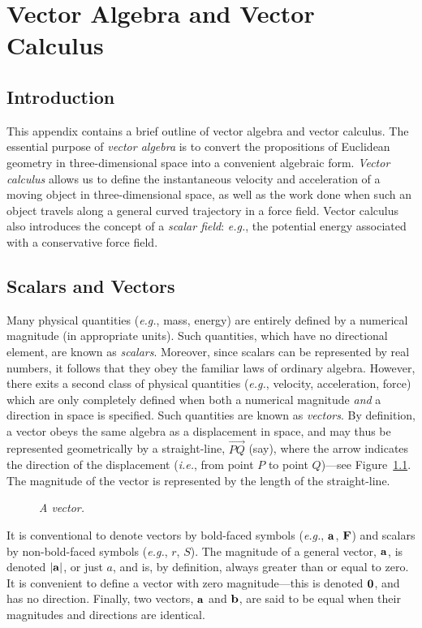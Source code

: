 \chapter{Vector Algebra and Vector Calculus}\label{vector}
\section{Introduction}
This appendix contains a brief outline of  vector algebra and vector calculus. The essential purpose of {\em vector algebra}\/
is to convert the propositions of Euclidean geometry  in three-dimensional
space into a convenient algebraic form. {\em Vector calculus}\/ allows us to define
the instantaneous velocity and acceleration of a moving object in three-dimensional space, as
well as the work done when such an object travels along a general
curved trajectory in a force field. Vector calculus also introduces the concept of a {\em scalar
field}: {\em e.g.}, the potential energy associated with a conservative force field.

\section{Scalars and Vectors}
Many physical quantities ({\em e.g.}, mass, energy) are 
 entirely defined by a numerical magnitude (in appropriate units). Such quantities, which have no directional element, are
known as {\em scalars}. Moreover, since scalars can be represented by real numbers,
it follows that they obey the familiar laws of ordinary algebra. However, there exits a
second class of physical quantities ({\em e.g.}, velocity, acceleration, force) which are
only completely defined when both a numerical magnitude {\em and}\/ a direction in space is specified. 
Such quantities are known as {\em vectors}. By definition, a vector obeys the same algebra as
a displacement in space, and may thus be represented geometrically by a
straight-line, $\stackrel{\displaystyle \rightarrow}{PQ}$ (say), where the arrow
indicates the direction of the displacement ({\em i.e.}, from point $P$ to point $Q$)---see Figure~\ref{fig1}. 
The magnitude of the vector is represented by the length of the  straight-line.

\begin{figure}
\epsfysize=1.25in
\centerline{}
\caption{\em A vector.}\label{fig1}
\end{figure}

It is conventional to denote vectors by bold-faced symbols ({\em e.g.}, ${\bf a}$, ${\bf F}$) and
scalars by non-bold-faced symbols ({\em e.g.}, $r$, $S$). The magnitude of
a general vector, ${\bf a}$, is  denoted  $|{\bf a}|$, or just $a$, and is, by definition, always
greater than or equal to zero. It is convenient to define a vector with zero magnitude---this is
denoted ${\bf 0}$, and has no direction. Finally, two vectors, ${\bf a}$ and ${\bf b}$, are said
to be equal when their magnitudes and directions are identical. 

